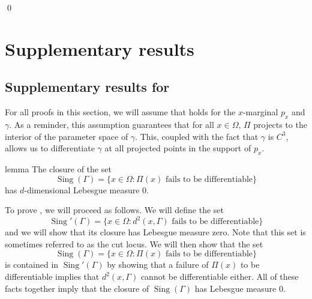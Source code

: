 \documentclass[11pt]{article}
\begin{document}
\qed{}

\section{Supplementary results}


\subsection{Supplementary results for }

For all proofs in this section, we will assume that  holds for the $x$-marginal $p_x$ and $\gamma$. As a reminder, this assumption guarantees that for all $x \in \Omega$,  $\Pi$ projects to the interior of the parameter space of $\gamma$. This, coupled with the fact that $\gamma$ is $C^3$, allows us to differentiate $\gamma$ at all projected points in the support of $p_x$.  

\begin{restatable}{lemma}{} \label{lemma: singular set measure}
    The closure of the set 
    \begin{equation}\operatorname{Sing}(\Gamma) = \{x \in \Omega: \Pi(x) \text{ fails to be differentiable}\} \label{eq: singular set}
    \end{equation}
    has $d$-dimensional Lebesgue measure $0$. 
\end{restatable}
\noindent To prove , we will proceed as follows.  We will define the set 
\[\operatorname{Sing}'(\Gamma) = \{x \in \Omega :  d^2(x, \Gamma) \text{ fails to be differentiable}\}\]
and we will show that its closure has Lebesgue measure zero. Note that this set is sometimes referred to as the cut locus. We will then show that the set 
\[\operatorname{Sing}(\Gamma) = \{x \in \Omega :  \Pi(x) \text{ fails to be differentiable}\}\]
is contained in $\operatorname{Sing}'(\Gamma)$ by showing that a failure of $\Pi(x)$ to be differentiable implies that $d^2(x, \Gamma)$ cannot be differentiable either. All of these facts together imply that the closure of $\operatorname{Sing}(\Gamma)$ has Lebesgue measure $0$.
\end{document}
